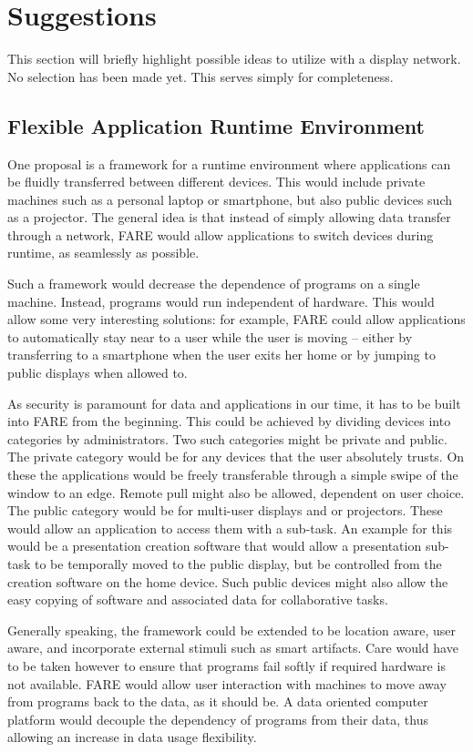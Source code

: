 \section{Suggestions}

This section will briefly highlight possible ideas to utilize with a display network.
No selection has been made yet.
This serves simply for completeness.

\subsection{Flexible Application Runtime Environment}

One proposal is a framework for a runtime environment where applications can be fluidly transferred between different devices.
This would include private machines such as a personal laptop or smartphone, but also public devices such as a projector.
The general idea is that instead of simply allowing data transfer through a network, FARE would allow applications to switch devices during runtime, as seamlessly as possible.

Such a framework would decrease the dependence of programs on a single machine.
Instead, programs would run independent of hardware.
This would allow some very interesting solutions: for example, FARE could allow applications to automatically stay near to a user while the user is moving – either by transferring to a smartphone when the user exits her home or by jumping to public displays when allowed to.

As security is paramount for data and applications in our time, it has to be built into FARE from the beginning.
This could be achieved by dividing devices into categories by administrators.
Two such categories might be private and public.
The private category would be for any devices that the user absolutely trusts.
On these the applications would be freely transferable through a simple swipe of the window to an edge.
Remote pull might also be allowed, dependent on user choice.
The public category would be for multi-user displays and or projectors.
These would allow an application to access them with a sub-task.
An example for this would be a presentation creation software that would allow a presentation sub-task to be temporally moved to the public display, but be controlled from the creation software on the home device.
Such public devices might also allow the easy copying of software and associated data for collaborative tasks.

Generally speaking, the framework could be extended to be location aware, user aware, and incorporate external stimuli such as smart artifacts.
Care would have to be taken however to ensure that programs fail softly if required hardware is not available.
FARE would allow user interaction with machines to move away from programs back to the data, as it should be.
A data oriented computer platform would decouple the dependency of programs from their data, thus allowing an increase in data usage flexibility.

